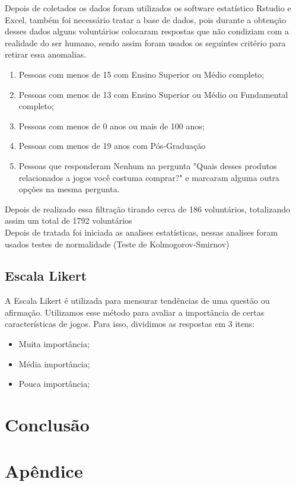 \documentclass[11pt,a4paper]{article}
\begin{document}
Depois de coletados os dados foram utilizados os software estatístico Rstudio e Excel, também foi necessário tratar a base de dados, pois durante a obtenção desses dados alguns voluntários colocaram respostas que não condiziam com a realidade do ser humano, sendo assim foram usados os seguintes critério para retirar essa anomalias.
 \begin{enumerate}[label=(\roman*)]
\item Pessoas com menos de 15 com Ensino Superior ou Médio completo; 
\item Pessoas com menos de 13 com  Ensino Superior ou Médio  ou Fundamental completo;
\item Pessoas com menos de 0 anos ou mais de 100 anos;
\item Pessoas com menos de 19 anos com Pós-Graduação
\item Pessoas que responderam Nenhum na pergunta "Quais desses produtos relacionados a jogos você costuma comprar?" e marcaram alguma outra opções na mesma pergunta.
\end{enumerate}
Depois de realizado essa filtração tirando cerca de 186 voluntários, totalizando assim um total de 1792 voluntários 
\\

Depois de tratada foi iniciada as analises estatísticas, nessas analises foram usados testes de normalidade (Teste de Kolmogorov-Smirnov)

\subsection{Escala Likert}

A Escala Likert é utilizada para mensurar tendências de uma questão ou afirmação. Utilizamos esse método para avaliar a importância de certas características de jogos. Para isso, dividimos as respostas em 3 itens:

\begin{itemize}[noitemsep,nolistsep]
\item Muita importância; 
\item Média importância;
\item Pouca importância;
\end{itemize}
 
\section{Conclusão}

\section{Apêndice}
\end{document}
